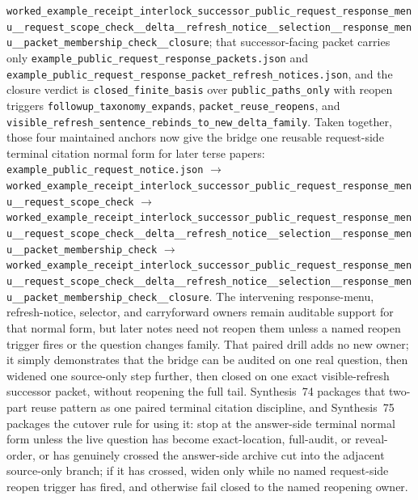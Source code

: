 \documentclass[11pt]{article}
\begin{document}
\texttt{worked\_example\_receipt\_interlock\_successor\_public\_request\_response\_menu\_\_request\_scope\_check\_\_delta\_\_refresh\_notice\_\_selection\_\_response\_menu\_\_packet\_membership\_check\_\_closure}; that successor-facing packet carries only \nolinkurl{example_public_request_response_packets.json} and \nolinkurl{example_public_request_response_packet_refresh_notices.json}, and the closure verdict is \texttt{closed\_finite\_basis} over \texttt{public\_paths\_only} with reopen triggers \texttt{followup\_taxonomy\_expands}, \texttt{packet\_reuse\_reopens}, and \texttt{visible\_refresh\_sentence\_rebinds\_to\_new\_delta\_family}. Taken together, those four maintained anchors now give the bridge one reusable request-side terminal citation normal form for later terse papers: \nolinkurl{example_public_request_notice.json} $\to$ \texttt{worked\_example\_receipt\_interlock\_successor\_public\_request\_response\_menu\_\_request\_scope\_check} $\to$ \texttt{worked\_example\_receipt\_interlock\_successor\_public\_request\_response\_menu\_\_request\_scope\_check\_\_delta\_\_refresh\_notice\_\_selection\_\_response\_menu\_\_packet\_membership\_check} $\to$ \texttt{worked\_example\_receipt\_interlock\_successor\_public\_request\_response\_menu\_\_request\_scope\_check\_\_delta\_\_refresh\_notice\_\_selection\_\_response\_menu\_\_packet\_membership\_check\_\_closure}. The intervening response-menu, refresh-notice, selector, and carryforward owners remain auditable support for that normal form, but later notes need not reopen them unless a named reopen trigger fires or the question changes family. That paired drill adds no new owner; it simply demonstrates that the bridge can be audited on one real question, then widened one source-only step further, then closed on one exact visible-refresh successor packet, without reopening the full tail. Synthesis~74 packages that two-part reuse pattern as one paired terminal citation discipline, and Synthesis~75 packages the cutover rule for using it: stop at the answer-side terminal normal form unless the live question has become exact-location, full-audit, or reveal-order, or has genuinely crossed the answer-side archive cut into the adjacent source-only branch; if it has crossed, widen only while no named request-side reopen trigger has fired, and otherwise fail closed to the named reopening owner.\cite{series:pairedterminalcitationdiscipline,series:pairedterminalcutoverrules}
\end{document}
